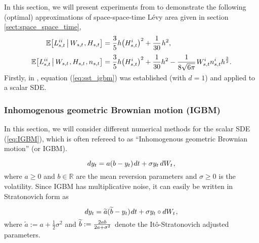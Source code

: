 \documentclass[sn-mathphys-num]{sn-jnl}%
\newcommand{\E}{\mathbb{E}}
\newcommand{\R}{\mathbb{R}}
\newcommand{\m}{\hspace{0.25mm}}
\begin{document}
In this section, we will present experiments from \cite{foster2020poly, tubikanec2022igbm, foster2024splitting} to demonstrate the following (optimal) approximations of space-space-time L\'{e}vy area given in section \ref{sect:space_space_time},\vspace{-2mm}
\begin{align}
\E\big[L_{s,t}^{ii}\,\big|\, W_{s,t}\m, H_{s,t}\big] & = \frac{3}{5}h\big(H_{s,t}^i\big)^2 + \frac{1}{30}\m h^2,\label{eq:sst_igbm}\\[3pt]
\E\big[L_{s,t}^{ii}\,\big|\, W_{s,t}\m, H_{s,t}\m, n_{s,t}\big] & = \frac{3}{5}h\big(H_{s,t}^i\big)^2 + \frac{1}{30} h^2  - \frac{1}{8\sqrt{6\pi}}\m W_{s,t}^i n_{s,t}^i h^\frac{3}{2}.\label{eq:sst_splitting}\\[-20pt] \nonumber
\end{align}
Firstly, in \cite{foster2020poly}, equation (\ref{eq:sst_igbm}) was established (with $d=1$) and applied to a scalar SDE.

\subsubsection{Inhomogenous geometric Brownian motion (IGBM)}

In this section, we will consider different numerical methods for the scalar SDE (\ref{eq:IGBM}), which is often refereed to as ``Inhomogenous geometric Brownian motion'' (or IGBM).\vspace{-2mm}
\begin{align}\label{eq:IGBM}
dy_t = a(b-y_t)\m dt + \sigma y_t\, dW_t\m,\\[-20pt] \nonumber
\end{align}
where $a\geq 0$ and $b\in\R$ are the mean reversion parameters and $\sigma \geq 0$ is the volatility.
Since IGBM has multiplicative noise, it can easily be written in Stratonovich form as\vspace{-2mm}
\begin{align}\label{eq:IGBM_strat}
dy_t = \widetilde{a}(\widetilde{b}-y_t)\m dt + \sigma y_t \circ dW_t\m,\\[-20pt] \nonumber
\end{align}
where $\widetilde{a} := a + \frac{1}{2}\sigma^2$ and $\widetilde{b} := \frac{2ab}{2a+\sigma^2}\m$ denote the It\^{o}-Stratonovich adjusted  parameters.\medbreak
\end{document}
